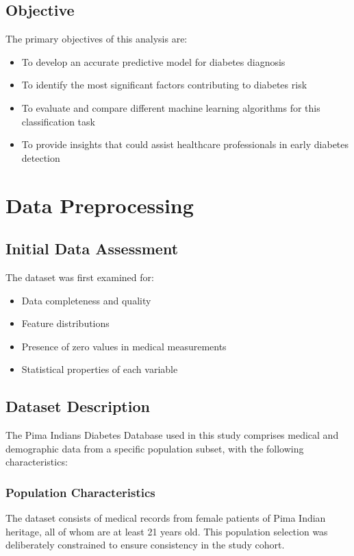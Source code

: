 \documentclass[a4paper,12pt]{article}
\begin{document}
\subsection{Objective}
The primary objectives of this analysis are:
\begin{itemize}
    \item{To develop an accurate predictive model for diabetes diagnosis}
    \item{To identify the most significant factors contributing to diabetes risk}
    \item{To evaluate and compare different machine learning algorithms for this classification task}
    \item{To provide insights that could assist healthcare professionals in early diabetes detection}
\end{itemize}

\section{Data Preprocessing}
\subsection{Initial Data Assessment}
The dataset was first examined for:
\begin{itemize}
    \item{Data completeness and quality}
    \item{Feature distributions}
    \item{Presence of zero values in medical measurements}
    \item{Statistical properties of each variable}
\end{itemize}

\subsection{Dataset Description}
The Pima Indians Diabetes Database used in this study comprises medical and demographic data from a specific population subset, with the following characteristics:

\subsubsection{Population Characteristics}
The dataset consists of medical records from female patients of Pima Indian heritage, all of whom are at least 21 years old. This population selection was deliberately constrained to ensure consistency in the study cohort.
\end{document}
